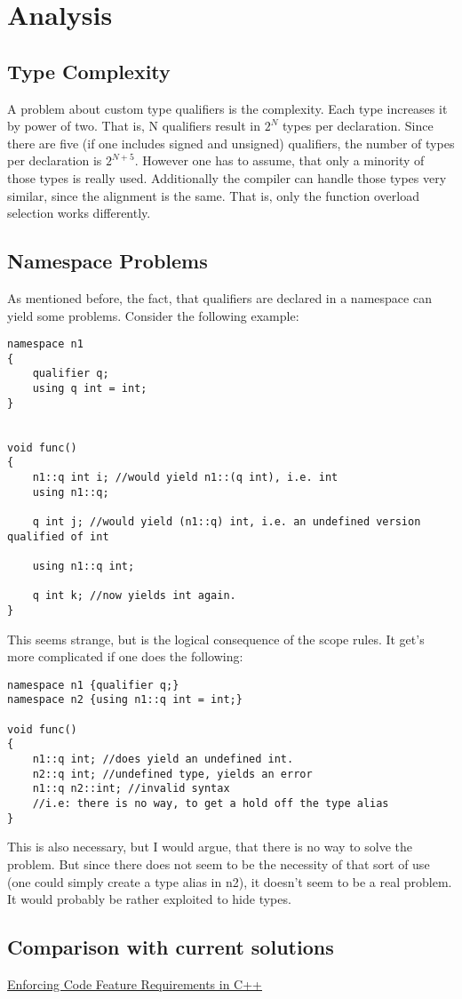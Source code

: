 \section{Analysis}
\subsection{Type Complexity}
A problem about custom type qualifiers is the complexity. Each type increases it by power of two. That is, N qualifiers result in $2^N$ types per declaration. 
Since there are five (if one includes signed and unsigned) qualifiers, the number of types per declaration is $2^{N+5}$. However one has to assume, that only a minority of those types is really used. Additionally the compiler can handle those types very similar, since the alignment is the same. That is, only the function overload selection works differently.
\subsection{Namespace Problems}
As mentioned before, the fact, that qualifiers are declared in a namespace can yield some problems. Consider the following example:
\begin{lstlisting}
namespace n1
{
	qualifier q;
	using q int = int;
}


void func()
{
	n1::q int i; //would yield n1::(q int), i.e. int
	using n1::q;
	
	q int j; //would yield (n1::q) int, i.e. an undefined version qualified of int 
	
	using n1::q int;
	
	q int k; //now yields int again.
}
\end{lstlisting}
This seems strange, but is the logical consequence of the scope rules. It get's more complicated if one does the following:
\begin{lstlisting}
namespace n1 {qualifier q;}
namespace n2 {using n1::q int = int;}

void func()
{
	n1::q int; //does yield an undefined int.
	n2::q int; //undefined type, yields an error
	n1::q n2::int; //invalid syntax
	//i.e: there is no way, to get a hold off the type alias
} 
\end{lstlisting}
This is also necessary, but I would argue, that there is no way to solve the problem. But since there does not seem to be the necessity of that sort of use (one could simply create a type alias in n2), it doesn't seem to be a real problem. It would probably be rather exploited to hide types.
\subsection{Comparison with current solutions}
\href{http://www.artima.com/cppsource/codefeatures.html}{Enforcing Code Feature Requirements in C++}